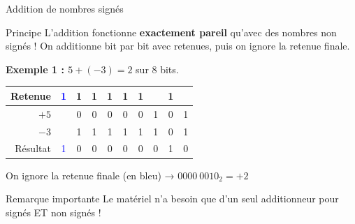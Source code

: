 \documentclass[aspectratio=1610]{beamer}
\begin{document}
\begin{frame}{Addition de nombres signés}

  \begin{block}{Principe}
    L'addition fonctionne \textbf{exactement pareil} qu'avec des nombres non signés !
    On additionne bit par bit avec retenues, puis on ignore la retenue finale.
  \end{block}

  \vspace{0.3cm}

  \textbf{Exemple 1 : $5 + (-3) = 2$} sur 8 bits.

  \begin{center}
    \begin{tabular}{r|ccccccccc}
      Retenue & \textcolor{blue}{1} & 1 & 1 & 1 & 1 & 1 &  & 1 & \\
      \hline
      $+5$ &  & 0 & 0 & 0 & 0 & 0 & 1 & 0 & 1 \\
      $-3$ & & 1 & 1 & 1 & 1 & 1 & 1 & 0 & 1 \\
      \hline
      Résultat & \textcolor{blue}{1} & 0 & 0 & 0 & 0 & 0 & 0 & 1 & 0 \\
    \end{tabular}
  \end{center}

  \vspace{0.2cm}

  On ignore la retenue finale (en bleu) → $0000\ 0010_2 = +2$


  \begin{alertblock}{Remarque importante}
    Le matériel n'a besoin que d'un seul additionneur pour signés ET non signés !
  \end{alertblock}

\end{frame}
\end{document}
